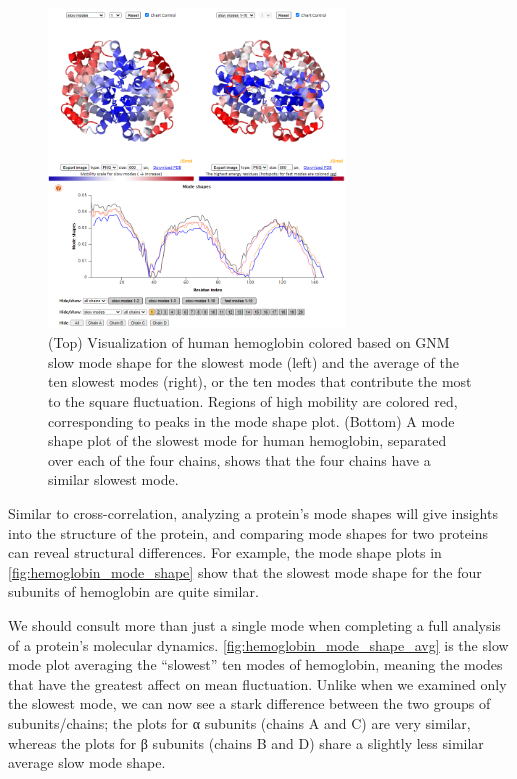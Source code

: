 \begin{figure}[h]
	\centering
	\mySfFamily
	\includegraphics[width = 0.7\textwidth]{../images/hemoglobin_mode_shape.png}
	\caption{(Top) Visualization of human hemoglobin colored based on GNM slow mode shape for the slowest mode (left) and the average of the ten slowest modes (right), or the ten modes that contribute the most to the square fluctuation. Regions of high mobility are colored red, corresponding to peaks in the mode shape plot. (Bottom) A mode shape plot of the slowest mode for human hemoglobin, separated over each of the four chains, shows that the four chains have a similar slowest mode.}
	\label{fig:hemoglobin_mode_shape}
\end{figure}

Similar to cross-correlation, analyzing a protein's mode shapes will give insights into the structure of the protein, and comparing mode shapes for two proteins can reveal structural differences. For example, the mode shape plots in \autoref{fig:hemoglobin_mode_shape} show that the slowest mode shape for the four subunits of hemoglobin are quite similar.

We should consult more than just a single mode when completing a full analysis of a protein's molecular dynamics. \autoref{fig:hemoglobin_mode_shape_avg} is the slow mode plot averaging the ``slowest'' ten modes of hemoglobin, meaning the modes that have the greatest affect on mean fluctuation. Unlike when we examined only the slowest mode, we can now see a stark difference between the two groups of subunits/chains; the plots for α subunits (chains A and C) are very similar, whereas the plots for β subunits (chains B and D) share a slightly less similar average slow mode shape.

